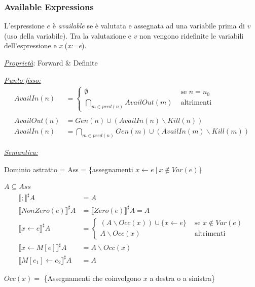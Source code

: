 \documentclass[a4paper, 11pt]{report}
\begin{document}
\subsubsection*{Available Expressions}
L'espressione $e$ è \textit{available} se è valutata e assegnata ad una variabile prima di $v$ (uso della variabile). Tra la valutazione e $v$ non vengono ridefinite le variabili dell'espressione e \textit{x} (\textit{x:=e}).
\newline

\noindent
\textit{\underline{Proprietà}}: Forward \& Definite
\newline

\noindent
\underline{\textit{Punto fisso:}}
\begin{align*}
	AvailIn(n) &= 
	\begin{cases}
	\emptyset &\text{ se } n = n_0 \\
	\bigcap_{m\in pred(n)} AvailOut(m) &\text{ altrimenti}
	\end{cases}\\ \\
	AvailOut(n) &= Gen(n) \cup (AvailIn(n)\backslash Kill(n))\\
	AvailIn(n) &= \bigcap_{m\in pred(n)} Gen(m) \cup (AvailIn(m)\backslash Kill(m))
\end{align*}

\noindent
\underline{\textit{Semantica:}}

Dominio astratto = Ass = \{assegnamenti $x\leftarrow e ~|~ x\notin Var(e)$\}

$A\subseteq Ass$
\begin{align*}
	\llbracket ; \rrbracket^\sharp A &= A\\
	\llbracket NonZero(e) \rrbracket^\sharp A &= \llbracket Zero(e) \rrbracket^\sharp A = A\\
	\llbracket x\leftarrow e \rrbracket^\sharp A &= \begin{cases}
	(A\backslash Occ(x)) \cup \{x\leftarrow e \} &\text{ se } x\notin Var(e) \\
	A\backslash Occ(x) &\text{ altrimenti}
	\end{cases}\\
	\llbracket x\leftarrow M[e] \rrbracket^\sharp A &= A\backslash Occ(x)\\
	\llbracket M[e_1]\leftarrow e_2 \rrbracket^\sharp A &= A
\end{align*}

$Occ(x) = $ \{Assegnamenti che coinvolgono $x$ a destra o a sinistra\}
\end{document}
